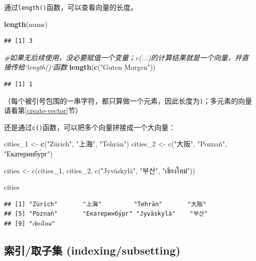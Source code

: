 \documentclass[]{book}
\newenvironment{Shaded}{\begin{snugshade}}{\end{snugshade}}
\newcommand{\CommentTok}[1]{\textcolor[rgb]{0.56,0.35,0.01}{\textit{#1}}}
\newcommand{\DecValTok}[1]{\textcolor[rgb]{0.00,0.00,0.81}{#1}}
\newcommand{\KeywordTok}[1]{\textcolor[rgb]{0.13,0.29,0.53}{\textbf{#1}}}
\newcommand{\NormalTok}[1]{#1}
\newcommand{\StringTok}[1]{\textcolor[rgb]{0.31,0.60,0.02}{#1}}
\begin{document}
通过\texttt{length()}函数，可以查看向量的长度。

\begin{Shaded}
\begin{Highlighting}[]
\KeywordTok{length}\NormalTok{(nums)}
\end{Highlighting}
\end{Shaded}

\begin{verbatim}
## [1] 3
\end{verbatim}

\begin{Shaded}
\begin{Highlighting}[]
\CommentTok{#如果无后续使用，没必要赋值一个变量；c(...)的计算结果就是一个向量，并直接传给`length()`函数}
\KeywordTok{length}\NormalTok{(}\KeywordTok{c}\NormalTok{(}\StringTok{"Guten Morgen"}\NormalTok{)) }
\end{Highlighting}
\end{Shaded}

\begin{verbatim}
## [1] 1
\end{verbatim}

（每个被引号包围的一串字符，都只算做一个元素，因此长度为1；多元素的向量请看第\ref{create-vector}节）

还是通过\texttt{c()}函数，可以把多个向量拼接成一个大向量：

\begin{Shaded}
\begin{Highlighting}[]
\NormalTok{cities_}\DecValTok{1}\NormalTok{ <-}\StringTok{ }\KeywordTok{c}\NormalTok{(}\StringTok{"Zürich", "}\NormalTok{上海}\StringTok{", "}\NormalTok{Tehrān}\StringTok{")}
\StringTok{cities_2 <- c("}\NormalTok{大阪}\StringTok{", "}\NormalTok{Poznań}\StringTok{", "}\NormalTok{Екатеринбу́рг}\StringTok{")}

\StringTok{cities <- c(cities_1, cities_2, c("}\NormalTok{Jyväskylä}\StringTok{", "}\NormalTok{부산}\StringTok{", "}\NormalTok{เชียงใหม่}\StringTok{"))}

\StringTok{cities}
\end{Highlighting}
\end{Shaded}

\begin{verbatim}
## [1] "Zürich"       "上海"         "Tehrān"       "大阪"        
## [5] "Poznań"       "Екатеринбу́рг" "Jyväskylä"    "부산"        
## [9] "เชียงใหม่"
\end{verbatim}

\hypertarget{indexing}{%
\subsection{索引/取子集 (indexing/subsetting)}\label{indexing}}
\end{document}
